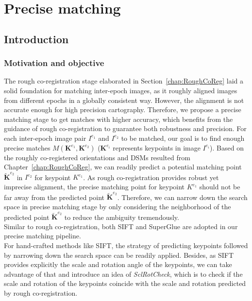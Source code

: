 
\chapter{Precise matching}
\label{chap:Precisematching}
\minitoc

\section{Introduction}
\subsection{Motivation and objective}
The rough co-registration stage elaborated in Section~\ref{chap:RoughCoReg} laid a solid foundation for matching inter-epoch images, as it roughly aligned images from different epochs in a globally consistent way. However, the alignment is not accurate enough for high precision cartography. 
Therefore, we propose a precise matching stage to get matches with higher accuracy, which benefits from the guidance of rough co-registration to guarantee both robustness and precision. 
For each inter-epoch image pair $I^{e_1}$ and $I^{e_2}$ to be matched, our goal is to find enough precise matches $M({\mathbf{K}^{e_1},\mathbf{K}^{e_2}})$ ($\mathbf{K}^{e_i}$ represents keypoints in image $I^{e_i}$). 
Based on the roughly co-registered orientations and \ac{DSM}s resulted from Chapter~\ref{chap:RoughCoReg}, 
we can readily predict a potential matching point $\widetilde{\mathbf{K}}^{e_2}$ in $I^{e_2}$ for keypoint ${K}^{e_1}$. %
As rough co-registration provides robust yet imprecise alignment, the precise matching point for keypoint ${K}^{e_1}$ should not be far away from the predicted point $\widetilde{\mathbf{K}}^{e_2}$. Therefore, we can narrow down the search space in precise matching stage by only considering the neighborhood of the predicted point $\widetilde{\mathbf{K}}^{e_2}$ to reduce the ambiguity tremendously.\\
Similar to rough co-registration, both SIFT and SuperGlue are adopted in our precise matching pipeline.\\
For hand-crafted methods like SIFT, the strategy of predicting keypoints followed by narrowing down the search space can be readily applied. Besides, as SIFT provides explicitly the scale and rotation angle of the keypoints, we can take advantage of that and introduce an idea of \textit{SclRotCheck}, which is to check if the scale and rotation of the keypoints coincide with the scale and rotation predicted by rough co-registration.\\

